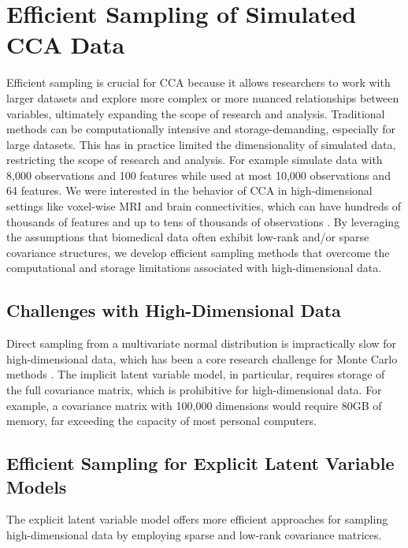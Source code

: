 \section{Efficient Sampling of Simulated CCA Data}\label{sec:efficient}

Efficient sampling is crucial for CCA because it allows researchers to work with larger datasets and explore more complex or more nuanced relationships between variables, ultimately expanding the scope of research and analysis. Traditional methods can be computationally intensive and storage-demanding, especially for large datasets.
This has in practice limited the dimensionality of simulated data, restricting the scope of research and analysis.
For example \citet{matkovic2023contribution} simulate data with 8,000 observations and 100 features while \citet{helmer2020stability} used at most 10,000 observations and 64 features.
We were interested in the behavior of CCA in high-dimensional settings like voxel-wise MRI and brain connectivities, which can have hundreds of thousands of features \citep{jack2008alzheimer} and up to tens of thousands of observations \citep{sudlow2015uk}.
By leveraging the assumptions that biomedical data often exhibit low-rank and/or sparse covariance structures, we develop efficient sampling methods that overcome the computational and storage limitations associated with high-dimensional data.

\subsection{Challenges with High-Dimensional Data}
Direct sampling from a multivariate normal distribution is impractically slow for high-dimensional data, which has been a core research challenge for Monte Carlo methods \citep{mackay1998introduction}. The implicit latent variable model, in particular, requires storage of the full covariance matrix, which is prohibitive for high-dimensional data. For example, a covariance matrix with 100,000 dimensions would require 80GB of memory, far exceeding the capacity of most personal computers.

\subsection{Efficient Sampling for Explicit Latent Variable Models}
The explicit latent variable model offers more efficient approaches for sampling high-dimensional data by employing sparse and low-rank covariance matrices.

